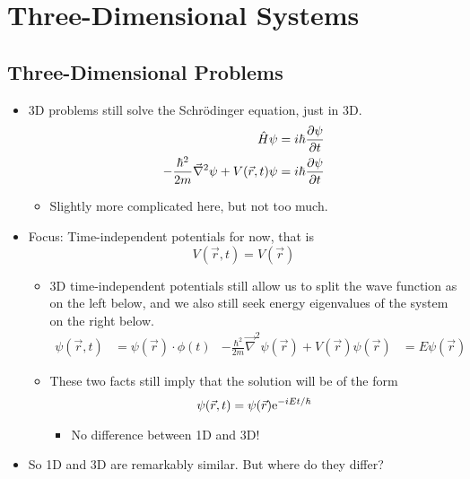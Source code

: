 \documentclass[../notes.tex]{subfiles}
\begin{document}
\chapter{Three-Dimensional Systems}
\section{Three-Dimensional Problems}
\begin{itemize}
    \item {}3D problems still solve the Schr\"{o}dinger equation, just in 3D.
    \begin{align*}
        \hat{H}\psi &= i\hbar\pdv{\psi}{t}\\
        -\frac{\hbar^2}{2m}\vec{\nabla}^2\psi+V(\vec{r},t)\psi &= i\hbar\pdv{\psi}{t}
    \end{align*}
    \begin{itemize}
        \item Slightly more complicated here, but not too much.
    \end{itemize}
    \item Focus: Time-independent potentials for now, that is
    \begin{equation*}
        V(\vec{r},t) = V(\vec{r})
    \end{equation*}
    \begin{itemize}
        \item 3D time-independent potentials still allow us to split the wave function as on the left below, and we also still seek energy eigenvalues of the system on the right below.
        \begin{align*}
            \psi(\vec{r},t) &= \psi(\vec{r})\cdot\phi(t)&
            -\frac{\hbar^2}{2m}\vec{\nabla}^2\psi(\vec{r})+V(\vec{r})\psi(\vec{r}) &= E\psi(\vec{r})
        \end{align*}
        \item These two facts still imply that the solution will be of the form
        \begin{equation*}
            \psi(\vec{r},t) = \psi(\vec{r})\e[-iEt/\hbar]
        \end{equation*}
        \begin{itemize}
            \item No difference between 1D and 3D!
        \end{itemize}
    \end{itemize}
    \item So 1D and 3D are remarkably similar. But where do they differ?

\end{itemize}
\end{document}
